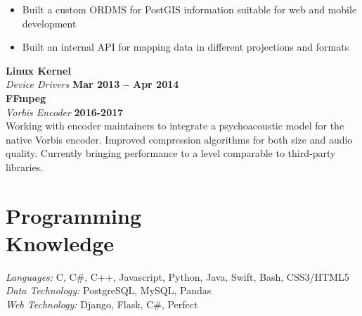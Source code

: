 \documentclass[margin,line]{resume}
\begin{document}
\begin{resume}
	\begin{itemize}
	\item Built a custom ORDMS for PostGIS information suitable for web and
		mobile development
	\item Built an internal API for mapping data in different projections and
		formats
	\end{itemize}

    \textbf{Linux Kernel} \vspace{2mm}\\\vspace{1mm}%
    \textsl{Device Drivers} \hfill \textbf{Mar 2013 -- Apr 2014}\\


	\textbf{FFmpeg} \vspace{2mm}\\\vspace{1mm}%
	\textsl{Vorbis Encoder} \hfill \textbf{2016-2017}\\
	Working with encoder maintainers to integrate a psychoacoustic model for 
	the native Vorbis encoder. Improved compression algorithms for both size
	and audio quality. Currently bringing performance to a level comparable to
	third-party libraries.

    \section{\mysidestyle Programming\\Knowledge}

    \emph{Languages:} C, C\#, C++, Javascript, Python, Java, Swift, Bash,
	CSS3/HTML5\\
	\emph{Data Technology:} PostgreSQL, MySQL, Pandas\\
	\emph{Web Technology:} Django, Flask, C\#, Perfect\\
\end{resume}
\end{document}
